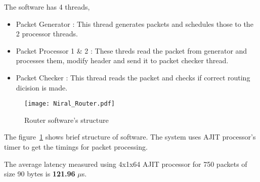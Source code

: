 \begin{appendices}
		The software has 4 threads,
		
		\begin{itemize}
			\item Packet Generator : This thread generates packets and schedules those to the 2 processor threads.
			\item Packet Processor 1 \& 2 : These threds read the packet from generator and processes them, modify header and send it to packet checker thread.
			\item Packet Checker : 	This thread reads the packet and checks if correct routing dicision is made.
		\end{itemize}
	
			
			\begin{figure}[h!]
				\centering
				\texttt{[image: Niral\_Router.pdf]}
				\caption{Router software's structure}
				\label{app:router_soft}
			\end{figure}
		
		The figure~\ref{app:router_soft} shows brief structure of software. The system uses AJIT processor's timer to get the timings for packet processing.
		
		The average latency measured using 4x1x64 AJIT processor for 750 packets of size 90 bytes is \textbf{121.96} $\mu$s.











\end{appendices}

\iffalse
\begin{algorithm}
	\caption{Tmp alg template to use.}\label{alg:cap}
	\begin{algorithmic}
		\Require $n \geq 0$
		\Ensure $y = x^n$
		\State $y \gets 1$
		\State $X \gets x$
		\State $N \gets n$
		\While{$N \neq 0$}
		\If{$N$ is even}
		\State $X \gets X \times X$
		\State $N \gets \frac{N}{2}$  \Comment{This is a comment}
		\ElsIf{$N$ is odd}
		\State $y \gets y \times X$
		\State $N \gets N - 1$
		\EndIf
		\EndWhile
	\end{algorithmic}
\end{algorithm}
\fi